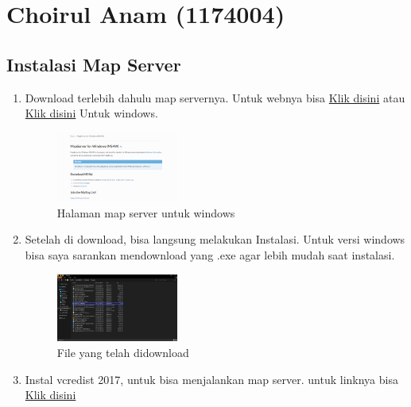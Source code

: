 \section{Choirul Anam (1174004)}
\subsection{Instalasi Map Server}
\begin{enumerate}
    \item Download terlebih dahulu map servernya. Untuk webnya bisa \href{https://mapserver.org/}{Klik disini} atau \href{https://ms4w.com/}{Klik disini} Untuk windows.
    \hfill\break
    \begin{figure}[H]
		\includegraphics[width=4cm]{figures/1174004/4/1.PNG}
		\centering
		\caption{Halaman map server untuk windows}
    \end{figure}
    \item Setelah di download, bisa langsung melakukan Instalasi. Untuk versi windows bisa saya sarankan mendownload yang .exe agar lebih mudah saat instalasi.
    \hfill\break
    \begin{figure}[H]
		\includegraphics[width=4cm]{figures/1174004/4/2.png}
		\centering
		\caption{File yang telah didownload}
    \end{figure}
    \item Instal vcredist 2017, untuk bisa menjalankan map server. untuk linknya bisa \href{https://support.microsoft.com/id-id/help/2977003/the-latest-supported-visual-c-downloads}{Klik disini}
\end{enumerate}
